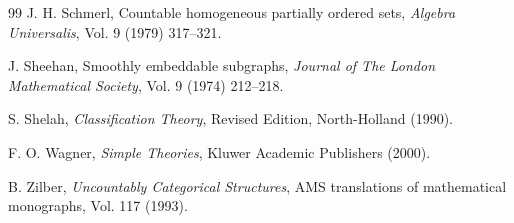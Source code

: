 \documentclass[11pt, twoside]{amsart}
\numberwithin{equation}{section}
\begin{document}
\begin{thebibliography}{99}
 J. H. Schmerl, Countable homogeneous partially ordered sets,
{\em Algebra Universalis}, Vol. 9 (1979) 317--321.

 J. Sheehan, Smoothly embeddable subgraphs,
{\em Journal of The London Mathematical Society}, Vol. 9 (1974) 212--218.

 S. Shelah, {\em Classification Theory}, Revised Edition, North-Holland (1990).

 F. O. Wagner, {\em Simple Theories}, Kluwer Academic Publishers (2000).

 B. Zilber, {\em Uncountably Categorical Structures}, 
AMS translations of mathematical monographs, Vol. 117 (1993).

\end{thebibliography}
\end{document}

